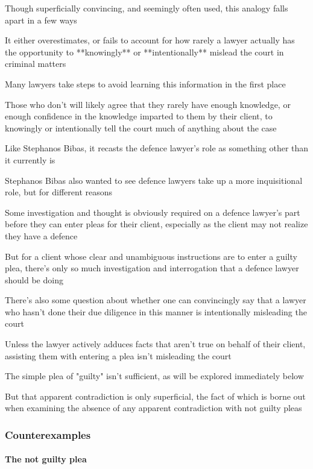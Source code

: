 Though superficially convincing, and seemingly often used, this analogy falls apart in a few ways

It either overestimates, or fails to account for how rarely a lawyer actually has the opportunity to **knowingly** or **intentionally** mislead the court in criminal matters

Many lawyers take steps to avoid learning this information in the first place

Those who don't will likely agree that they rarely have enough knowledge, or enough confidence in the knowledge imparted to them by their client, to knowingly or intentionally tell the court much of anything about the case

Like Stephanos Bibas, it recasts the defence lawyer's role as something other than it currently is

Stephanos Bibas also wanted to see defence lawyers take up a more inquisitional role, but for different reasons

Some investigation and thought is obviously required on a defence lawyer's part before they can enter pleas for their client, especially as the client may not realize they have a defence

But for a client whose clear and unambiguous instructions are to enter a guilty plea, there's only so much investigation and interrogation that a defence lawyer should be doing

There's also some question about whether one can convincingly say that a lawyer who hasn't done their due diligence in this manner is intentionally misleading the court

Unless the lawyer actively adduces facts that aren't true on behalf of their client, assisting them with entering a plea isn't misleading the court

The simple plea of "guilty" isn't sufficient, as will be explored immediately below

But that apparent contradiction is only superficial, the fact of which is borne out when examining the absence of any apparent contradiction with not guilty pleas

\subsubsection{Counterexamples}

\paragraph{The not guilty plea\\}

